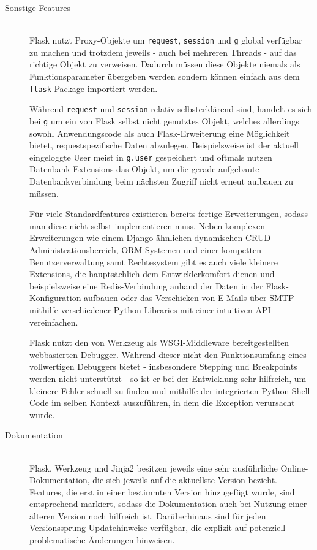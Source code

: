 \begin{description}
\item[Sonstige Features] \hfill \\
Flask nutzt Proxy-Objekte um \lstinline{request}, \lstinline{session} und \lstinline{g} global
verfügbar zu machen und trotzdem jeweils - auch bei mehreren Threads - auf das richtige Objekt zu
verweisen. Dadurch müssen diese Objekte niemals als Funktionsparameter übergeben werden sondern
können einfach aus dem \lstinline{flask}-Package importiert werden.

Während \lstinline{request} und \lstinline{session} relativ selbsterklärend sind, handelt es sich
bei \lstinline{g} um ein von Flask selbst nicht genutztes Objekt, welches allerdings sowohl
Anwendungscode als auch Flask-Erweiterung eine Möglichkeit bietet, requestspezifische Daten
abzulegen. Beispielsweise ist der aktuell eingeloggte User meist in \lstinline{g.user} gespeichert
und oftmals nutzen Datenbank-Extensions das Objekt, um die gerade aufgebaute Datenbankverbindung
beim nächsten Zugriff nicht erneut aufbauen zu müssen.

Für viele Standardfeatures existieren bereits fertige Erweiterungen, sodass man diese nicht selbst
implementieren muss. Neben komplexen Erweiterungen wie einem Django-ähnlichen dynamischen
CRUD-Administrationsbereich, ORM-Systemen und einer kompetten Benutzerverwaltung samt Rechtesystem
gibt es auch viele kleinere Extensions, die hauptsächlich dem Entwicklerkomfort dienen und
beispielsweise eine Redis-Verbindung anhand der Daten in der Flask-Konfiguration aufbauen oder
das Verschicken von E-Mails über SMTP mithilfe verschiedener Python-Libraries mit einer intuitiven
API vereinfachen.

Flask nutzt den von Werkzeug als WSGI-Middleware bereitgestellten webbasierten Debugger. Während
dieser nicht den Funktionsumfang eines vollwertigen Debuggers bietet - insbesondere Stepping und
Breakpoints werden nicht unterstützt - so ist er bei der Entwicklung sehr hilfreich, um kleinere
Fehler schnell zu finden und mithilfe der integrierten Python-Shell Code im selben Kontext
auszuführen, in dem die Exception verursacht wurde.


\item[Dokumentation] \hfill \\
Flask, Werkzeug und Jinja2 besitzen jeweils eine sehr ausführliche Online-Dokumentation, die sich
jeweils auf die aktuellste Version bezieht. Features, die erst in einer bestimmten Version
hinzugefügt wurde, sind entsprechend markiert, sodass die Dokumentation auch bei Nutzung einer
älteren Version noch hilfreich ist. Darüberhinaus sind für jeden Versionssprung Updatehinweise
verfügbar, die explizit auf potenziell problematische Änderungen hinweisen.


\end{description}
